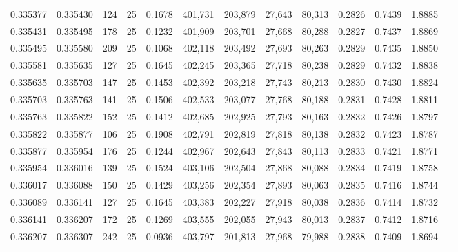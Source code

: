 \begin{tabular}{rrrrrrrrrrrrr}
0.335377 & 0.335430 &   124 &  25 &                                     0.1678 & 401,731 & 203,879 &  27,643 &  80,313 & 0.2826 & 0.7439 & 1.8885 \\
0.335431 & 0.335495 &   178 &  25 &                                     0.1232 & 401,909 & 203,701 &  27,668 &  80,288 & 0.2827 & 0.7437 & 1.8869 \\
0.335495 & 0.335580 &   209 &  25 &                                     0.1068 & 402,118 & 203,492 &  27,693 &  80,263 & 0.2829 & 0.7435 & 1.8850 \\
0.335581 & 0.335635 &   127 &  25 &                                     0.1645 & 402,245 & 203,365 &  27,718 &  80,238 & 0.2829 & 0.7432 & 1.8838 \\
0.335635 & 0.335703 &   147 &  25 &                                     0.1453 & 402,392 & 203,218 &  27,743 &  80,213 & 0.2830 & 0.7430 & 1.8824 \\
0.335703 & 0.335763 &   141 &  25 &                                     0.1506 & 402,533 & 203,077 &  27,768 &  80,188 & 0.2831 & 0.7428 & 1.8811 \\
0.335763 & 0.335822 &   152 &  25 &                                     0.1412 & 402,685 & 202,925 &  27,793 &  80,163 & 0.2832 & 0.7426 & 1.8797 \\
0.335822 & 0.335877 &   106 &  25 &                                     0.1908 & 402,791 & 202,819 &  27,818 &  80,138 & 0.2832 & 0.7423 & 1.8787 \\
0.335877 & 0.335954 &   176 &  25 &                                     0.1244 & 402,967 & 202,643 &  27,843 &  80,113 & 0.2833 & 0.7421 & 1.8771 \\
0.335954 & 0.336016 &   139 &  25 &                                     0.1524 & 403,106 & 202,504 &  27,868 &  80,088 & 0.2834 & 0.7419 & 1.8758 \\
0.336017 & 0.336088 &   150 &  25 &                                     0.1429 & 403,256 & 202,354 &  27,893 &  80,063 & 0.2835 & 0.7416 & 1.8744 \\
0.336089 & 0.336141 &   127 &  25 &                                     0.1645 & 403,383 & 202,227 &  27,918 &  80,038 & 0.2836 & 0.7414 & 1.8732 \\
0.336141 & 0.336207 &   172 &  25 &                                     0.1269 & 403,555 & 202,055 &  27,943 &  80,013 & 0.2837 & 0.7412 & 1.8716 \\
0.336207 & 0.336307 &   242 &  25 &                                     0.0936 & 403,797 & 201,813 &  27,968 &  79,988 & 0.2838 & 0.7409 & 1.8694 \\

\end{tabular}
